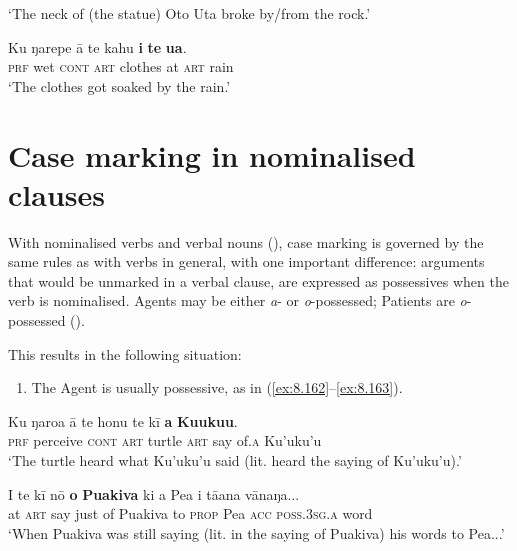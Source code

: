\glt 
‘The neck of (the statue) Oto Uta broke by/from the rock.’ \textstyleExampleref{[MsE-089.002]}
\z

\ea\label{ex:8.161}
\gll Ku ŋarepe {\ꞌ}ā te kahu \textbf{{\ꞌ}i} \textbf{te} \textbf{{\ꞌ}ua}. \\
\textsc{prf} wet \textsc{cont} \textsc{art} clothes at \textsc{art} rain \\

\glt 
‘The clothes got soaked by the rain.’ 
\z
{}

\section{Case marking in nominalised clauses}\label{sec:8.7}
With nominalised verbs and verbal nouns (), case marking is governed by the same rules as with verbs in general, with one important difference: arguments that would be unmarked in a verbal clause, are expressed as possessives when the verb is nominalised. Agents may be either \textit{a}{}- or \textit{o}{}-possessed; Patients are \textit{o}{}-possessed ().

This results in the following situation:

\begin{enumerate}
\item 
The Agent is usually possessive, as in (\ref{ex:8.162}–\ref{ex:8.163}). 
\end{enumerate}

\ea\label{ex:8.162}
\gll Ku ŋaro{\ꞌ}a {\ꞌ}ā te honu te kī \textbf{{\ꞌ}a} \textbf{Ku{\ꞌ}uku{\ꞌ}u}. \\
\textsc{prf} perceive \textsc{cont} \textsc{art} turtle \textsc{art} say of\textsc{.a} Ku’uku’u \\

\glt 
‘The turtle heard what Ku’uku’u said (lit. heard the saying of Ku’uku’u).’ \textstyleExampleref{[Ley-2-02.034]}
\z

\ea\label{ex:8.163}
\gll {\ꞌ}I te kī nō \textbf{o} \textbf{Puakiva} ki a Pea i tā{\ꞌ}ana vānaŋa... \\
at \textsc{art} say just of Puakiva to \textsc{prop} Pea \textsc{acc} \textsc{poss.3sg.a} word \\

\glt
‘When Puakiva was still saying (lit. in the saying of Puakiva) his words to Pea...’ \textstyleExampleref{[R229.489]} 
\z

